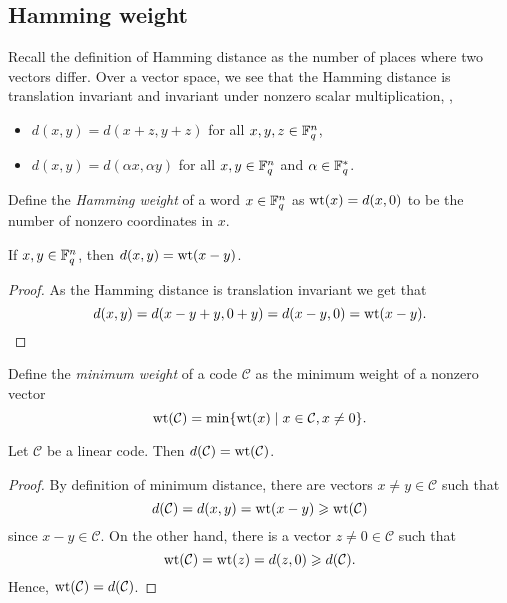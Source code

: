 \documentclass[../main.tex]{subfiles}
\begin{document}
\subsection{Hamming weight}

Recall the definition of Hamming distance as the number of places where two vectors differ. Over a vector space, we see that the Hamming distance is translation invariant and invariant under nonzero scalar multiplication, \ie,
\begin{itemize}
    \item $d(x, y) = d(x + z, y + z)$ for all $x, y, z \in \mathbb{F}_q^n$,
    \item $d(x, y) = d(\alpha x, \alpha y)$ for all $x, y \in \mathbb{F}_q^n$ and $\alpha \in \mathbb{F}_q^*$.
\end{itemize}

Define the \emph{Hamming weight} of a word $x \in \mathbb{F}_q^n$ as $\operatorname{wt}(x) = d(x, 0)$ to be the number of nonzero coordinates in $x$.

\begin{lemma}\label{lem:Hamming_distance_as_weight}
If $x, y \in \mathbb{F}_q^n$, then $d(x, y) = \operatorname{wt}(x - y)$.
\end{lemma}

\begin{proof}
As the Hamming distance is translation invariant we get that
\begin{equation*}
    d(x, y) = d(x - y + y, 0 + y) = d(x - y, 0) = \operatorname{wt}(x - y). \qedhere
\end{equation*}
\end{proof}

Define the \emph{minimum weight} of a code $\mathcal{C}$ as the minimum weight of a nonzero vector
\begin{equation*}
    \operatorname{wt}(\mathcal{C}) = \min \{ \operatorname{wt}(x) \mid x \in \mathcal{C}, x \neq 0 \}.
\end{equation*}

\begin{lemma}\label{lem:linear_code_distance}
Let $\mathcal{C}$ be a linear code. Then $d(\mathcal{C}) = \operatorname{wt}(\mathcal{C})$.
\end{lemma}

\begin{proof}
By definition of minimum distance, there are vectors $x \neq y \in \mathcal{C}$ such that
\begin{equation*}
    d(\mathcal{C}) = d(x, y) = \operatorname{wt}(x - y) \geqslant \operatorname{wt}(\mathcal{C})
\end{equation*}
since $x - y \in \mathcal{C}$. On the other hand, there is a vector $z \neq 0 \in \mathcal{C}$ such that
\begin{equation*}
    \operatorname{wt}(\mathcal{C}) = \operatorname{wt}(z) = d(z, 0) \geqslant d(\mathcal{C}).
\end{equation*}
Hence, $\operatorname{wt}(\mathcal{C}) = d(\mathcal{C})$.
\end{proof}
\end{document}
